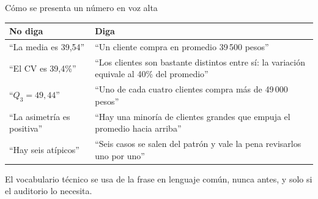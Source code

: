 \documentclass[aspectratio=169,10pt]{beamer}
\begin{document}
\begin{frame}{Cómo se presenta un número en voz alta}
  \scriptsize
  \begin{center}
  \begin{tabular}{@{}p{5.6cm}p{6.2cm}@{}}
    \toprule
    \textbf{No diga} & \textbf{Diga} \\
    \midrule
    ``La media es 39,54'' &
      ``Un cliente compra en promedio 39\,500 pesos'' \\
    \addlinespace
    ``El CV es 39,4\%'' &
      ``Los clientes son bastante distintos entre sí: la variación equivale al
      40\% del promedio'' \\
    \addlinespace
    ``$Q_3 = 49{,}44$'' &
      ``Uno de cada cuatro clientes compra más de 49\,000 pesos'' \\
    \addlinespace
    ``La asimetría es positiva'' &
      ``Hay una minoría de clientes grandes que empuja el promedio hacia
      arriba'' \\
    \addlinespace
    ``Hay seis atípicos'' &
      ``Seis casos se salen del patrón y vale la pena revisarlos uno por
      uno'' \\
    \bottomrule
  \end{tabular}
  \end{center}

  \vspace{0.05cm}
  {\tiny\color{uniGris} El vocabulario técnico se usa  de la
  frase en lenguaje común, nunca antes, y solo si el auditorio lo necesita.}
\end{frame}
\end{document}
